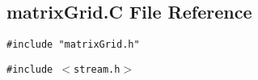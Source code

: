 \subsection{matrix\-Grid.C File Reference}
\label{matrixGrid.C}
{\tt \#include "matrix\-Grid.h"}\par
{\tt \#include $<$stream.h$>$}\par
